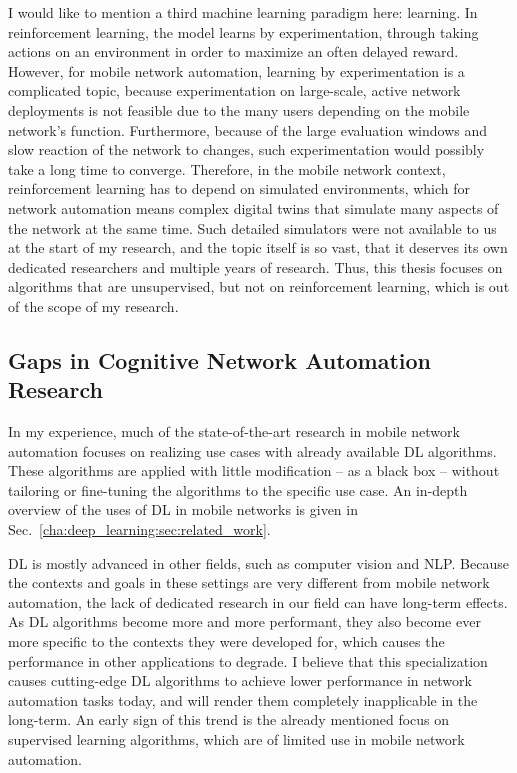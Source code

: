 		 	I would like to mention a third machine learning paradigm here:  learning.
			In reinforcement learning, the model learns by experimentation, through taking actions on an environment in order to maximize an often delayed reward.
			However, for mobile network automation, learning by experimentation is a complicated topic, because experimentation on large-scale, active network deployments is not feasible due to the many users depending on the mobile network's function.
			Furthermore, because of the large evaluation windows and slow reaction of the network to changes, such experimentation would possibly take a long time to converge.
			Therefore, in the mobile network context, reinforcement learning has to depend on simulated environments, which for network automation means complex digital twins that simulate many aspects of the network at the same time.
			Such detailed simulators were not available to us at the start of my research, and the topic itself is so vast, that it deserves its own dedicated researchers and multiple years of research. 
			Thus, this thesis focuses on algorithms that are unsupervised, but not on reinforcement learning, which is out of the scope of my research.
			
		\subsection{Gaps in Cognitive Network Automation Research}
			\label{cha:intro:sec:motivation}
		
			In my experience, much of the state-of-the-art research in mobile network automation focuses on realizing use cases with already available \ac{DL} algorithms.
			These algorithms are applied with little modification -- as a black box -- without tailoring or fine-tuning the algorithms to the specific use case.
			An in-depth overview of the uses of \ac{DL} in mobile networks is given in Sec.~\ref{cha:deep_learning:sec:related_work}.
		
			\ac{DL} is mostly advanced in other fields, such as computer vision and \ac{NLP}.
			Because the contexts and goals in these settings are very different from mobile network automation, the lack of dedicated research in our field can have long-term effects.
			As \ac{DL} algorithms become more and more performant, they also become ever more specific to the contexts they were developed for, which causes the performance in other applications to degrade.
			I believe that this specialization causes cutting-edge \ac{DL} algorithms to achieve lower performance in network automation tasks today, and will render them completely inapplicable in the long-term.
			An early sign of this trend is the already mentioned focus on supervised learning algorithms, which are of limited use in mobile network automation.
			
